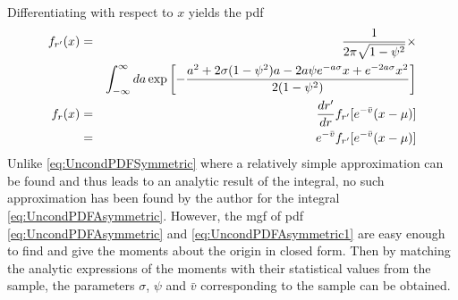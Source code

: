 Differentiating with respect to $x$ yields the \gls{pdf}
\begin{eqnarray}
  f_{r'}(x) &=& {1 \over 2\pi \sqrt{1 - \psi^2}} \times \nonumber \\
  && \int_{-\infty}^\infty da \exp
  \left[- {
      a^2 + 2\sigma(1 - \psi^2)a - 2a\psi e^{-a\sigma} x + e^{-2a\sigma} x^2
      \over
      2(1 - \psi^2)
  }
  \right] \label{eq:UncondPDFAsymmetric} \\
  f_r(x) &=&  \frac{d r'}{d r} f_{r'}[e^{-\bar{v}} (x - \mu)] \nonumber \\
  &=& e^{-\bar{v}} f_{r'}[e^{-\bar{v}}
  (x-\mu)] \label{eq:UncondPDFAsymmetric1}
\end{eqnarray}
Unlike \ref{eq:UncondPDFSymmetric} where a relatively simple
approximation can be found and thus leads to an analytic result of the
integral, no such approximation has been found by the
author for the integral \ref{eq:UncondPDFAsymmetric}. However, the
\gls{mgf} of \gls{pdf} \ref{eq:UncondPDFAsymmetric}
and \ref{eq:UncondPDFAsymmetric1} are easy enough to find and give the
moments about the origin in closed form. Then by matching the analytic
expressions of the moments with their statistical values from the
sample, the parameters $\sigma$, $\psi$ and $\bar{v}$ corresponding to the
sample can be obtained.

